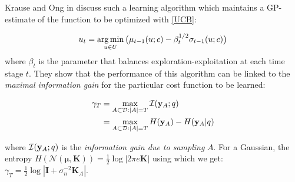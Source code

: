 
Krause and Ong in  discuss such a learning algorithm which maintains a GP-estimate of the function to be optimized with \eqref{UCB}:

\begin{equation}
u_{t} = \operatorname*{arg\,min}_{u \in U} \big(\mu_{t-1}(u;c) - \beta_t^{1/2}\sigma_{t-1}(u;c) \big)
\label{UCB}
\end{equation}
where $\beta_t$ is the parameter that balances exploration-exploitation at each time stage $t$. They show that the performance of this algorithm can be linked to the \emph{maximal information gain} for the particular cost function to be learned:

\begin{align}
\gamma_{T}  &= \max_{A \subset \mathcal{D}: |A| = T} \mathcal{I}(\mathbf{y}_{A};q) \\
&= \max_{A \subset \mathcal{D}: |A| = T} H(\mathbf{y}_{A}) - H(\mathbf{y}_{A}|q)
\end{align}

where $\mathcal{I}(\mathbf{y}_{A};q)$ is the \emph{information gain due to sampling} $A$. For a Gaussian, the entropy $H(\mathcal{N}(\boldsymbol{\mu},\mathbf{K})) = \frac{1}{2}\log|2\pi e \mathbf{K}|$ using which we get: $\gamma_T = \frac{1}{2}\log|\mathbf{I} + \sigma_n^{-2}\mathbf{K}_{A}|$.

